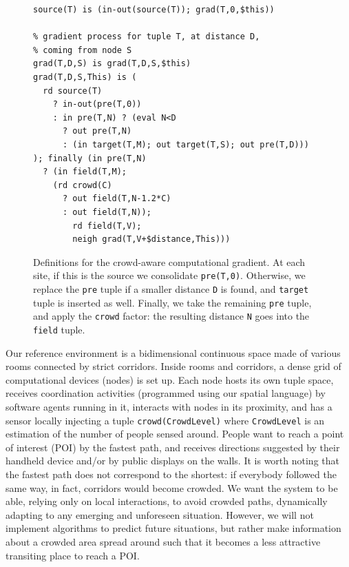 \documentclass[12pt,a4paper,twoside,openright]{book}
\begin{document}
\begin{figure}
{\begin{Verbatim}[samepage=true, frame=single, commandchars=\\\{\}, label={\small \bf Crowd-aware gradient}]
% creating a gradient spreading tuple T
source(T) is (in-out(source(T)); grad(T,0,$this))

% gradient process for tuple T, at distance D,
% coming from node S
grad(T,D,S) is grad(T,D,S,$this)
grad(T,D,S,This) is (
  rd source(T)
    ? in-out(pre(T,0))
    : in pre(T,N) ? (eval N<D 
      ? out pre(T,N)
      : (in target(T,M); out target(T,S); out pre(T,D)))
); finally (in pre(T,N)
  ? (in field(T,M);
    (rd crowd(C)
      ? out field(T,N-1.2*C)
      : out field(T,N));
        rd field(T,V);
        neigh grad(T,V+$distance,This))) 
\end{Verbatim}
}
\vspace{-15pt}\caption[Context sensitive gradient in $\sigma{}\tau{}-Linda$]{Definitions for the crowd-aware computational gradient. At each site, if this is the source we consolidate \texttt{pre(T,0)}. Otherwise, we replace the \texttt{pre} tuple if a smaller distance \texttt{D} is found, and \texttt{target} tuple is inserted as well. Finally, we take the remaining \texttt{pre} tuple, and apply the \texttt{crowd} factor: the resulting distance \texttt{N} goes into the \texttt{field} tuple.}
\label{img:linda-gradient}
\end{figure}

Our reference environment is a bidimensional continuous space made of various rooms connected by strict corridors. 
%
Inside rooms and corridors, a dense grid of computational devices (nodes) is set up. 
%
Each node hosts its own tuple space, receives coordination activities (programmed using our spatial language) by software agents running in it, interacts with nodes in its proximity, and has a sensor locally injecting a tuple \texttt{crowd(CrowdLevel)} where \texttt{CrowdLevel} is an estimation of the number of people sensed around.
%
People want to reach a point of interest (POI) by the fastest path, and receives directions suggested by their handheld device and/or by public displays on the walls.
%
It is worth noting that the fastest path does not correspond to the shortest: if everybody followed the same way, in fact, corridors would become crowded.
%
We want the system to be able, relying only on local interactions, to avoid crowded paths, dynamically adapting to any emerging and unforeseen situation.
%
However, we will not implement algorithms to predict future situations, but rather make information about a crowded area spread around such that it becomes a less attractive transiting place to reach a POI.
\end{document}
